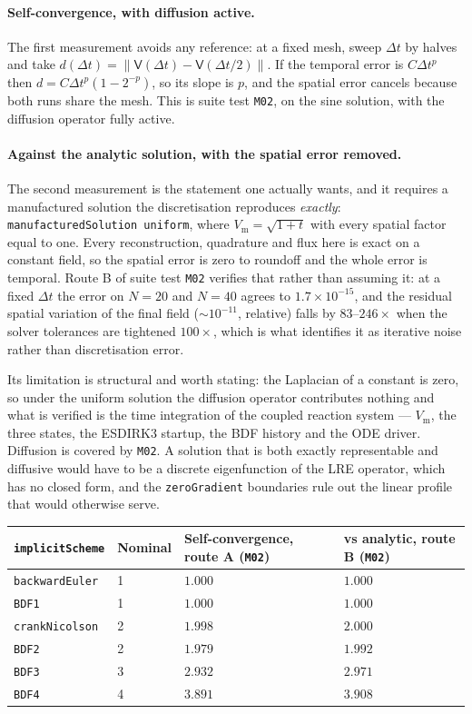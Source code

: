 \documentclass[11pt,a4paper]{article}
\newcommand{\code}[1]{\texttt{\small #1}}
\newcommand{\Vm}{V_{\text{m}}}
\begin{document}
\paragraph{Self-convergence, with diffusion active.} The first measurement
avoids any reference: at a fixed mesh, sweep $\Delta t$ by halves and take
$d(\Delta t)=\|\mathsf{V}(\Delta t)-\mathsf{V}(\Delta t/2)\|$. If the temporal
error is $C\Delta t^p$ then $d = C\Delta t^p(1-2^{-p})$, so its slope is $p$, and
the spatial error cancels because both runs share the mesh. This is suite test
\code{M02}, on the sine solution, with the diffusion operator fully active.

\paragraph{Against the analytic solution, with the spatial error removed.} The
second measurement is the statement one actually wants, and it requires a
manufactured solution the discretisation reproduces \emph{exactly}:
\code{manufacturedSolution uniform}, where $\Vm=\sqrt{1+t}$ with every spatial
factor equal to one. Every reconstruction, quadrature and flux here is exact on
a constant field, so the spatial error is zero to roundoff and the whole error is
temporal. Route B of suite test \code{M02} verifies that rather than assuming it: at a fixed
$\Delta t$ the error on $N=20$ and $N=40$ agrees to $1.7\times10^{-15}$, and the
residual spatial variation of the final field ($\sim10^{-11}$, relative) falls by
$83$--$246\times$ when the solver tolerances are tightened $100\times$, which is
what identifies it as iterative noise rather than discretisation error.

Its limitation is structural and worth stating: the Laplacian of a constant is
zero, so under the uniform solution the diffusion operator contributes nothing
and what is verified is the time integration of the coupled reaction system ---
$\Vm$, the three states, the ESDIRK3 startup, the BDF history and the ODE
driver. Diffusion is covered by \code{M02}. A solution that is both exactly
representable and diffusive would have to be a discrete eigenfunction of the LRE
operator, which has no closed form, and the \code{zeroGradient} boundaries rule
out the linear profile that would otherwise serve.

\begin{center}
\begin{tabular}{@{}llll@{}}
\toprule
\code{implicitScheme} & Nominal & Self-convergence, route A (\code{M02}) & vs analytic, route B (\code{M02}) \\
\midrule
\code{backwardEuler} & 1 & $1.000$ & $1.000$ \\
\code{BDF1}          & 1 & $1.000$ & $1.000$ \\
\code{crankNicolson} & 2 & $1.998$ & $2.000$ \\
\code{BDF2}          & 2 & $1.979$ & $1.992$ \\
\code{BDF3}          & 3 & $2.932$ & $2.971$ \\
\code{BDF4}          & 4 & $3.891$ & $3.908$ \\
\bottomrule
\end{tabular}
\end{center}
\end{document}

